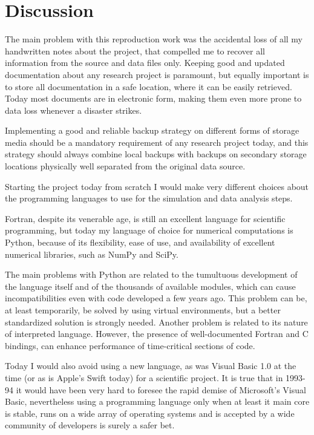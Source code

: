 \section{Discussion}

The main problem with this reproduction work was the accidental loss of all my handwritten notes about the project, that compelled me to recover all information from the source and data files only. 
Keeping good and updated documentation about any research project is paramount, but equally important is to store all documentation in a safe location, where it can be easily retrieved.
Today most documents are in electronic form, making them even more prone to data loss whenever a disaster strikes.

Implementing a good and reliable backup strategy on different forms of storage media should be a mandatory requirement of any research project today, and this strategy should always combine local backups with backups on secondary storage locations physically well separated from the original data source. 

Starting the project today from scratch I would make very different choices about the programming languages to use for the simulation and data analysis steps.

Fortran, despite its venerable age, is still an excellent language for scientific programming, but today my language of choice for numerical computations is Python, because of its flexibility, ease of use, and  availability of excellent numerical libraries, such as NumPy and SciPy.

The main problems with Python are related to the tumultuous development of the language itself and of the thousands of available modules, which can cause incompatibilities even with code developed a few years ago. This problem can be, at least temporarily, be solved by using virtual environments, but a better standardized solution is strongly needed.
Another problem is related to its nature of interpreted language. However, the presence of well-documented Fortran and C bindings, can enhance performance of time-critical sections of code.

Today I would also avoid using a new language, as was Visual Basic 1.0 at the time (or as is Apple's Swift today) for a scientific project. 
It is true that in 1993-94 it would have been very hard to foresee the rapid demise of Microsoft's Visual Basic, nevertheless using a programming language only when at least it main core is stable, runs on a wide array of operating systems and is accepted by a wide community of developers is surely a safer bet.

